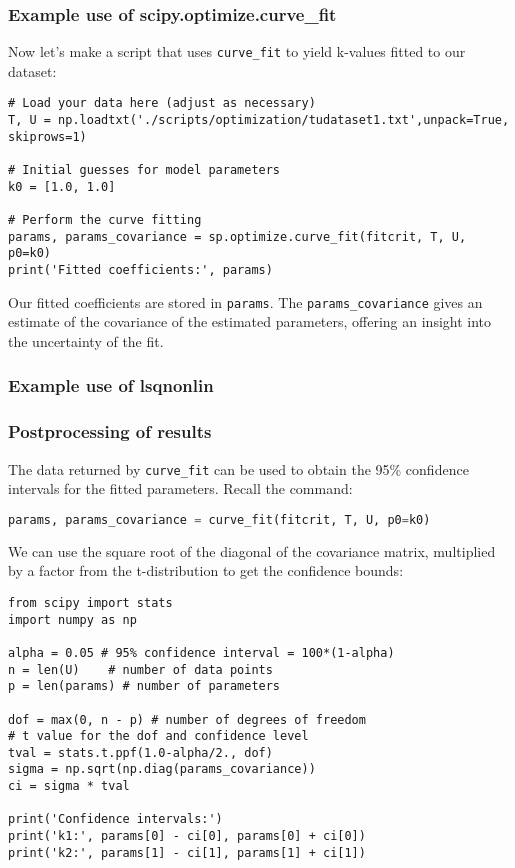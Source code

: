     \begin{frame}[fragile] 
    \frametitle{Example use of scipy.optimize.curve\_fit}
    Now let's make a script that uses \lstinline$curve_fit$ to yield k-values fitted to our dataset:
    \pause
    \begin{lstlisting}
# Load your data here (adjust as necessary)
T, U = np.loadtxt('./scripts/optimization/tudataset1.txt',unpack=True, skiprows=1)

# Initial guesses for model parameters
k0 = [1.0, 1.0]

# Perform the curve fitting
params, params_covariance = sp.optimize.curve_fit(fitcrit, T, U, p0=k0)
print('Fitted coefficients:', params)
    \end{lstlisting}
    Our fitted coefficients are stored in \lstinline|params|. The \lstinline|params_covariance| gives an estimate of the covariance of the estimated parameters, offering an insight into the uncertainty of the fit.
    \end{frame}      

\begin{frame}[fragile] 
  \frametitle{Example use of lsqnonlin}
  \centering
\end{frame}

\begin{frame}[fragile] 
  \frametitle{Postprocessing of results}
  The data returned by \lstinline|curve_fit| can be used to obtain the 95\% confidence intervals for the fitted parameters. Recall the command:
  \begin{lstlisting}[language=Python]
params, params_covariance = curve_fit(fitcrit, T, U, p0=k0)
  \end{lstlisting}
  We can use the square root of the diagonal of the covariance matrix, multiplied by a factor from the t-distribution to get the confidence bounds:
  \begin{lstlisting}
from scipy import stats
import numpy as np

alpha = 0.05 # 95% confidence interval = 100*(1-alpha)
n = len(U)    # number of data points
p = len(params) # number of parameters

dof = max(0, n - p) # number of degrees of freedom
# t value for the dof and confidence level
tval = stats.t.ppf(1.0-alpha/2., dof) 
sigma = np.sqrt(np.diag(params_covariance))
ci = sigma * tval

print('Confidence intervals:')
print('k1:', params[0] - ci[0], params[0] + ci[0])
print('k2:', params[1] - ci[1], params[1] + ci[1])
  \end{lstlisting}
  \end{frame}


